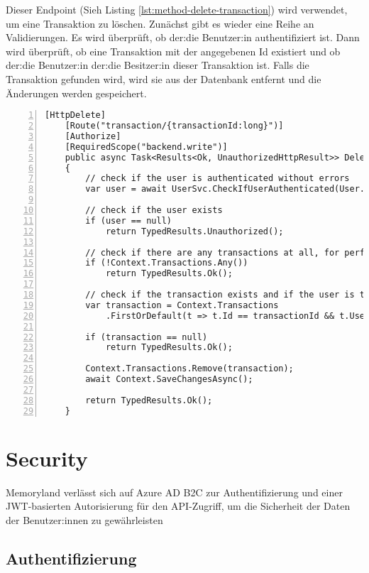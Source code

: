 Dieser Endpoint (Sieh Listing \ref{lst:method-delete-transaction}) wird verwendet, um eine Transaktion zu löschen. Zunächst gibt es wieder eine
Reihe an Validierungen. Es wird überprüft, ob der:die Benutzer:in authentifiziert ist. 
Dann wird überprüft, ob eine Transaktion mit der angegebenen Id existiert und ob der:die 
Benutzer:in der:die Besitzer:in dieser Transaktion ist. Falls die Transaktion gefunden 
wird, wird sie aus der Datenbank entfernt und die Änderungen werden gespeichert.

\begin{lstlisting}[numbers=left,caption={Methode DeleteTransactionById},label={lst:method-delete-transaction}]
    [HttpDelete]
    [Route("transaction/{transactionId:long}")]
    [Authorize]
    [RequiredScope("backend.write")]
    public async Task<Results<Ok, UnauthorizedHttpResult>> DeleteTransactionById(long transactionId)
    {
        // check if the user is authenticated without errors
        var user = await UserSvc.CheckIfUserAuthenticated(User.Claims);
        
        // check if the user exists
        if (user == null)
            return TypedResults.Unauthorized();
        
        // check if there are any transactions at all, for performance
        if (!Context.Transactions.Any()) 
            return TypedResults.Ok();
        
        // check if the transaction exists and if the user is the owner
        var transaction = Context.Transactions
            .FirstOrDefault(t => t.Id == transactionId && t.UserId == user.Id);
        
        if (transaction == null)
            return TypedResults.Ok();
        
        Context.Transactions.Remove(transaction);
        await Context.SaveChangesAsync();
            
        return TypedResults.Ok();
    }

\end{lstlisting}


\section{Security}

Memoryland verlässt sich auf Azure AD B2C zur Authentifizierung und einer 
JWT-basierten Autorisierung für den API-Zugriff, um die Sicherheit der Daten
der Benutzer:innen zu gewährleisten

\subsection{Authentifizierung}


